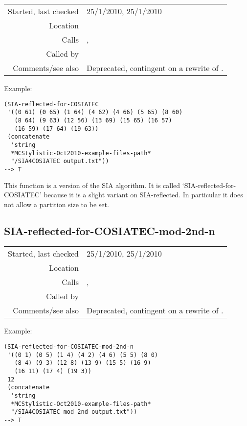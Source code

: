 \vspace{0.3cm}
\begin{tabular}{r|p{8cm}}
Started, last checked & 25/1/2010, 25/1/2010 \\
Location & \nameref{sec:further-structural-induction-algorithms} \\
Calls & \nameref{fun:subtract-two-lists}, \nameref{fun:write-to-file} \\
Called by & \nameref{fun:COSIATEC} \\
Comments/see also & Deprecated, contingent on a rewrite of \nameref{fun:COSIATEC}.
\end{tabular}

\vspace{0.5cm}
\noindent Example:
\begin{verbatim}
(SIA-reflected-for-COSIATEC
 '((0 61) (0 65) (1 64) (4 62) (4 66) (5 65) (8 60)
   (8 64) (9 63) (12 56) (13 69) (15 65) (16 57)
   (16 59) (17 64) (19 63))
 (concatenate
  'string
  *MCStylistic-Oct2010-example-files-path*
  "/SIA4COSIATEC output.txt"))
--> T
\end{verbatim}

\noindent This function is a version of the SIA
algorithm. It is called `SIA-reflected-for-COSIATEC'
because it is a slight variant on SIA-reflected. In
particular it does not allow a partition size to be
set.


\subsection*{SIA-reflected-for-COSIATEC-mod-2nd-n}\label{fun:SIA-reflected-for-COSIATEC-mod-2nd-n}

\vspace{0.3cm}
\begin{tabular}{r|p{8cm}}
Started, last checked & 25/1/2010, 25/1/2010 \\
Location & \nameref{sec:further-structural-induction-algorithms} \\
Calls & \nameref{fun:subtract-two-lists-mod-2nd-n}, \nameref{fun:write-to-file} \\
Called by & \nameref{fun:COSIATEC-mod-2nd-n} \\
Comments/see also & Deprecated, contingent on a rewrite of \nameref{fun:COSIATEC-mod-2nd-n}.
\end{tabular}

\vspace{0.5cm}
\noindent Example:
\begin{verbatim}
(SIA-reflected-for-COSIATEC-mod-2nd-n
 '((0 1) (0 5) (1 4) (4 2) (4 6) (5 5) (8 0)
   (8 4) (9 3) (12 8) (13 9) (15 5) (16 9)
   (16 11) (17 4) (19 3))
 12
 (concatenate
  'string
  *MCStylistic-Oct2010-example-files-path*
  "/SIA4COSIATEC mod 2nd output.txt"))
--> T
\end{verbatim}


